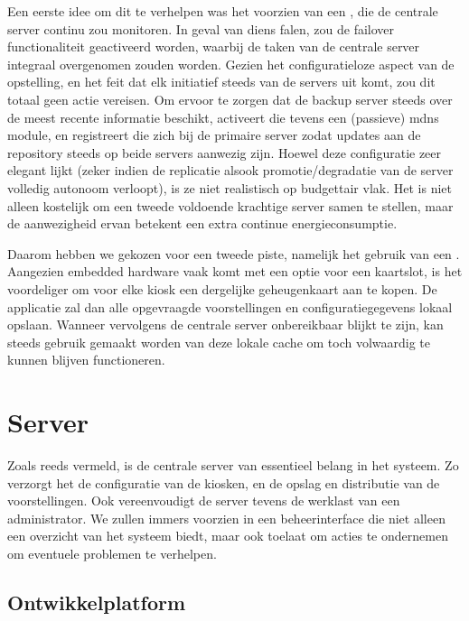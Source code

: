 Een eerste idee om dit te verhelpen was het voorzien van een , die de centrale server continu zou monitoren. In geval van diens falen, zou de failover functionaliteit geactiveerd worden, waarbij de taken van de centrale server integraal overgenomen zouden worden. Gezien het configuratieloze aspect van de opstelling, en het feit dat elk initiatief steeds van de servers uit komt, zou dit totaal geen actie vereisen. Om ervoor te zorgen dat de backup server steeds over de meest recente informatie beschikt, activeert die tevens een (passieve) \ac{mdns} module, en registreert die zich bij de primaire server zodat updates aan de repository steeds op beide servers aanwezig zijn.
Hoewel deze configuratie zeer elegant lijkt (zeker indien de replicatie alsook promotie/degradatie van de server volledig autonoom verloopt), is ze niet realistisch op budgettair vlak. Het is niet alleen kostelijk om een tweede voldoende krachtige server samen te stellen, maar de aanwezigheid ervan betekent een extra continue energieconsumptie.

Daarom hebben we gekozen voor een tweede piste, namelijk het gebruik van een . Aangezien embedded hardware vaak komt met een optie voor een kaartslot, is het voordeliger om voor elke kiosk een dergelijke geheugenkaart aan te kopen. De applicatie zal dan alle opgevraagde voorstellingen en configuratiegegevens lokaal opslaan. Wanneer vervolgens de centrale server onbereikbaar blijkt te zijn, kan steeds gebruik gemaakt worden van deze lokale cache om toch volwaardig te kunnen blijven functioneren.

\section{Server}
\label{ontwerp:applicatie:server}

Zoals reeds vermeld, is de centrale server van essentieel belang in het systeem. Zo verzorgt het de configuratie van de kiosken, en de opslag en distributie van de voorstellingen. Ook vereenvoudigt de server tevens de werklast van een administrator. We zullen immers voorzien in een beheerinterface die niet alleen een overzicht van het systeem biedt, maar ook toelaat om acties te ondernemen om eventuele problemen te verhelpen.

\subsection{Ontwikkelplatform}

